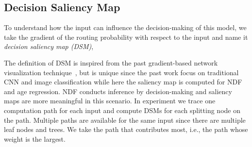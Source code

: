\documentclass{bmvc2k}
\begin{document}
\subsection{Decision Saliency Map}
To understand how the input can influence the decision-making of this model, we take the gradient of the routing probability with respect to the input and name it {\itshape decision saliency map (DSM)},



The definition of DSM is inspired from the past gradient-based network visualization technique~\cite{saliency}, but is unique since the past work focus on traditional CNN and image classification while here the saliency map is computed for NDF and age regression. NDF conducts inference by decision-making and saliency maps are more meaningful in this scenario. In experiment we trace one computation path for each input and compute DSMs for each splitting node on the path. Multiple paths are available for the same input since there are multiple leaf nodes and trees. We take the path that contributes most, i.e., the path whose weight  is the largest.
\end{document}
